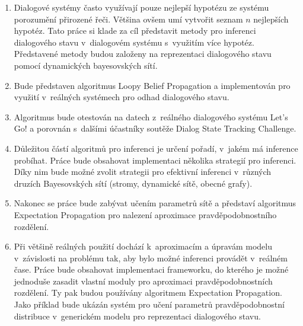 \begin{enumerate}
\item Dialogové systémy často využívají pouze nejlepší hypotézu ze systému porozumění přirozené řeči.
    Většina ovšem umí vytvořit seznam $n$ nejlepších hypotéz.
    Tato práce si klade za cíl představit metody pro inferenci dialogového stavu v~dialogovém systému s~využitím více hypotéz.
    Představené metody budou založeny na reprezentaci dialogového stavu pomocí dynamických bayesovských sítí.
\item Bude představen algoritmus Loopy Belief Propagation a implementován pro využití v~reálných systémech pro odhad dialogového stavu.
\item Algoritmus bude otestován na datech z~reálného dialogového systému Let's Go! a porovnán s~dalšími účastníky soutěže Dialog State Tracking Challenge.
\item Důležitou částí algoritmů pro inferenci je určení pořadí, v~jakém má inference probíhat.
    Práce bude obsahovat implementaci několika strategií pro inferenci. Díky nim bude možné zvolit strategii pro efektivní inferenci v~různých druzích Bayesovských sítí (stromy, dynamické sítě, obecné grafy).
\item Nakonec se práce bude zabývat učením parametrů sítě a představí algoritmus Expectation Propagation pro nalezení aproximace pravděpodobnostního rozdělení.
\item Při většině reálných použití dochází k~aproximacím a úpravám modelu v~závislosti na problému tak, aby bylo možné inferenci provádět v~reálném čase.
Práce bude obsahovat implementaci frameworku, do kterého je možné jednoduše zasadit vlastní moduly pro aproximaci pravděpodobnostních rozdělení.
Ty pak budou používány algoritmem Expectation Propagation.
Jako příklad bude ukázán systém pro učení parametrů pravděpodobnostní distribuce v~generickém modelu pro reprezentaci dialogového stavu.
\end{enumerate}
